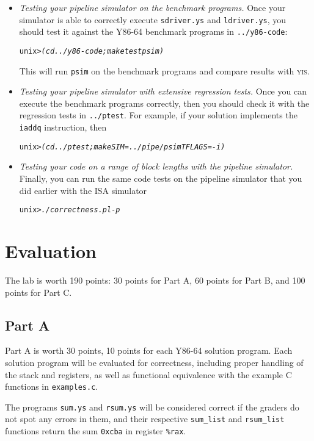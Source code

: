 \documentclass[11pt]{article}
\newenvironment{tty}%
{\small\begin{alltt}}%
{\end{alltt}}
\begin{document}
\begin{itemize}
\item {\em Testing your pipeline simulator on the benchmark programs.}
Once your simulator is able to correctly execute \texttt{sdriver.ys}
and \texttt{ldriver.ys},
you should test it against the Y86-64 benchmark programs in 
{\tt ../y86-code}:
\begin{tty}
unix> {\em (cd ../y86-code; make testpsim)}
\end{tty}
This will run {\tt psim} on the benchmark programs and compare 
results with \textsc{yis}.


\item {\em Testing your pipeline simulator with extensive regression tests.}
Once you can execute the benchmark programs correctly, then you should
check it with the regression tests in {\tt ../ptest}. For example,
if your solution implements the \texttt{iaddq} instruction, then
\begin{tty}
unix> {\em (cd ../ptest; make SIM=../pipe/psim TFLAGS=-i)}
\end{tty}

\item {\em Testing your code on a range of block lengths with the pipeline simulator.}
Finally, you can run the same code tests on the pipeline simulator that you did earlier with the ISA simulator
\begin{tty}
unix> {\em ./correctness.pl -p}
\end{tty}
\end{itemize}
\section{Evaluation}


The lab is worth 190 points: 30 points for Part A, 60 points for Part B,
and 100 points for Part C.

\subsection*{Part A}
Part A is worth 30 points, 10 points for each Y86-64 solution
program. Each solution program will be evaluated for correctness,
including proper handling of the stack and registers,
as well as functional equivalence with the example C functions in
\texttt{examples.c}.

The programs \texttt{sum.ys} and \texttt{rsum.ys} will be considered correct
if the graders do not spot any errors in them, and their respective \texttt{sum\_list} and \texttt{rsum\_list} 
functions return the sum \texttt{0xcba} in register \texttt{\%rax}.
\end{document}
